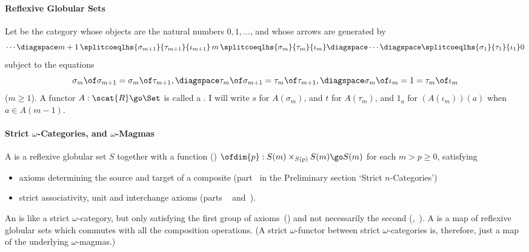 
		\label{p:p}



\paragraph{Reflexive Globular Sets}

Let  be the category whose objects are the natural numbers
$0,1,\ldots$, and whose arrows are generated by
\vspace{-4ex}
\[
\cdots \diagspace
m+1 \,
\splitcoeqlhs{\sigma_{m+1}}{\tau_{m+1}}{\iota_{m+1}} 
\, m \, 
\splitcoeqlhs{\sigma_m}{\tau_m}{\iota_m}
\diagspace \cdots \diagspace
\splitcoeqlhs{\sigma_1}{\tau_1}{\iota_1} 
0
\]
subject to the equations
\[
\sigma_m \of \sigma_{m+1} = \sigma_m \of \tau_{m+1},
\diagspace
\tau_m \of \sigma_{m+1} = \tau_m \of \tau_{m+1},
\diagspace
\sigma_m \of \iota_m = 1 = \tau_m \of \iota_m
\]
($m\geq 1$).  A functor $A: \scat{R} \go \Set$ is called a .  I will write $s$ for $A(\sigma_m)$, and $t$ for $A(\tau_m)$,
and $1_a$ for $(A(\iota_m))(a)$ when $a \in A(m-1)$. 

\paragraph{Strict $\omega$-Categories, and $\omega$-Magmas}

A  is a reflexive globular set $S$ together
with a function () $\ofdim{p}: S(m) \times_{S(p)} S(m) \go
S(m)$ for 
each $m > p \geq 0$, satisfying
%
\begin{itemize}
\item axioms determining the source and target of a composite
(part~ in the Preliminary section `Strict
$n$-Categories')
\item 	
strict associativity, unit and interchange axioms (parts
~ and~). 
\end{itemize}

An  is like a strict $\omega$-category, but only
satisfying the first group of axioms~() and
not necessarily the second
(,~).
A  is a map of reflexive globular sets which
commutes with all the composition operations.  (A strict $\omega$-functor
between strict $\omega$-categories is, therefore, just a map of the
underlying $\omega$-magmas.)



